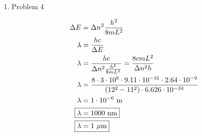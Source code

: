 \documentclass[12pt]{article}
\begin{document}
\begin{enumerate}
    d. Q branch line is halfway between the peaks 2295 cm$^{-1}$ and 2321 cm$^{-1}$.

    \begin{align*}
        \tilde{\nu} &= 2308 \text{ cm$^{-1}$} \\
        \nu &= c \tilde{\nu} \\
        \omega &= 2\pi \nu \\
        \omega &= 2\pi c \tilde{\nu} \\
        \omega &= \sqrt{\frac{k}{\mu}} \\
        k &= \omega^2\mu \\
        k &= \left(2\pi c \tilde{\nu}\right)^2\mu \\
        k &= \left(2\pi \cdot 3\cdot10^{10} \cdot 2308\right)^2 \cdot 1.648\cdot10^{-27} \\
        \Aboxed{k &= 311.9 \text{ N/m}}
    \end{align*}

    e. Replacing H with D would increae the reduced mass which would decrease B and decrease the vibrational frequency. Decreasing B would decrease the space between peaks. Decreasing the vibrational frequency would shift the wavenumbers of the whole spectrum down.

    \newpage
    \item Problem 4
    
    \begin{align*}
        \Delta E &= \Delta n^2 \frac{h^2}{8mL^2} \\
        \lambda &= \frac{hc}{\Delta E} \\
        \lambda &= \frac{hc}{\Delta n^2 \frac{h^2}{8mL^2}} = \frac{8cmL^2}{\Delta n^2 h} \\
        \lambda &= \frac{8 \cdot 3\cdot10^8 \cdot 9.11\cdot10^{-31} \cdot 2.64\cdot10^{-9}}{\left(12^2-11^2\right) \cdot 6.626\cdot10^{-34}} \\
        \lambda &= 1\cdot10^{-6} \text{ m} \\
        \Aboxed{\lambda &= 1000 \text{ nm}} \\
        \Aboxed{\lambda &= 1 \text{ $\mu$m}}
    \end{align*}

\end{enumerate}
\end{document}
